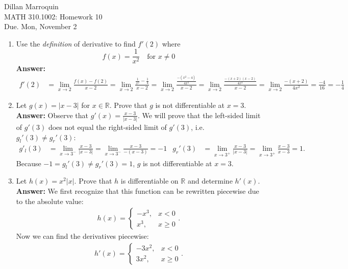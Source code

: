 \documentclass{article}
\begin{document}
    \noindent Dillan Marroquin\\ MATH 310.1002: Homework 10\\
    Due. Mon, November 2

    \begin{enumerate}
        \item Use the \textit{definition} of derivative to find $f' (2)$ where
            \[f(x) = \frac{1}{x^2} \quad \text{for }x \neq 0\]
        \textbf{Answer: }
        \begin{align*}
            f'(2) &= \lim_{x\to2}\frac{f(x)-f(2)}{x-2} = \lim_{x\to2}\frac{\frac{1}{x^2}-\frac{1}{4}}{x-2} = \lim_{x\to2}\frac{\frac{-(x^2-4)}{4x^2}}{x-2} = \lim_{x\to2}\frac{\frac{-(x+2)(x-2)}{4x^2}}{x-2} = \lim_{x\to2} \frac{-(x+2)}{4x^2} = \frac{-4}{16} = -\frac{1}{4}   
        \end{align*}
        
        \item Let $g(x) = |x-3|$ for $x \in \mathbb{R}$. Prove that $g$ is not differentiable at $x = 3$. \\
        \textbf{Answer: }Observe that $g'(x) = \frac{x-3}{|x-3|}$. We will prove that the left-sided limit of $g'(3)$ does not equal the right-sided limit of $g'(3)$, i.e. $g_l'(3) \neq g_r'(3)$:
        \begin{align*}
            g'_l(3) &= \lim_{x \to 3^-} \frac{x-3}{|x-3|} = \lim_{x\to3^-}\frac{x-3}{-(x-3)} = -1     &       g_r'(3) &= \lim_{x \to 3^+} \frac{x-3}{|x-3|} = \lim_{x\to3^+}\frac{x-3}{x-3} = 1.
        \end{align*}
        Because $-1 = g_l'(3) \neq g_r'(3) = 1$, $g$ is not differentiable at $x=3$.\\
        
        \item Let $h(x) = x^2|x|$. Prove that $h$ is differentiable on $\mathbb{R}$ and determine $h'(x)$.\\
        \textbf{Answer: }We first recognize that this function can be rewritten piecewise due to the absolute value:
            \begin{align*}
                h(x) =
                \begin{cases}
                    -x^3, & x<0\\
                    x^3, & x \geq 0
                \end{cases}.
            \end{align*}
        Now we can find the derivatives piecewise:
            \begin{align*}
                h'(x) = 
                \begin{cases}
                    -3x^2, & x<0\\
                    3x^2, & x \geq 0
                \end{cases}.
            \end{align*}
        

\end{enumerate}
\end{document}
